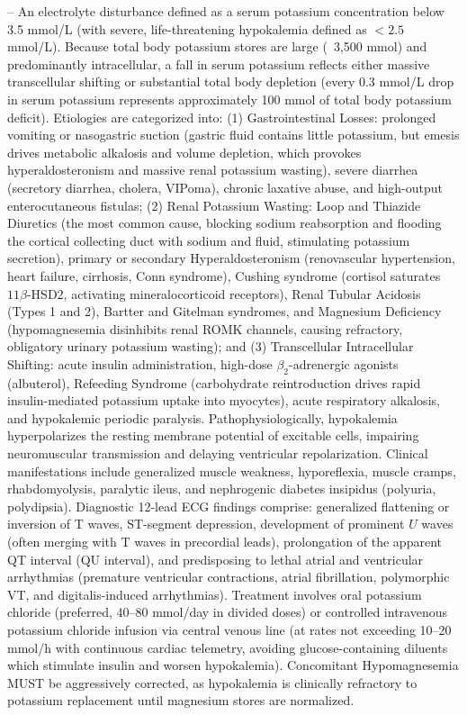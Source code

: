 -- An electrolyte disturbance defined as a serum potassium concentration below 3.5 mmol/L (with severe, life-threatening hypokalemia defined as $<2.5$ mmol/L). Because total body potassium stores are large (~3,500 mmol) and predominantly intracellular, a fall in serum potassium reflects either massive transcellular shifting or substantial total body depletion (every 0.3 mmol/L drop in serum potassium represents approximately 100 mmol of total body potassium deficit). Etiologies are categorized into: (1) Gastrointestinal Losses: prolonged vomiting or nasogastric suction (gastric fluid contains little potassium, but emesis drives metabolic alkalosis and volume depletion, which provokes hyperaldosteronism and massive renal potassium wasting), severe diarrhea (secretory diarrhea, cholera, VIPoma), chronic laxative abuse, and high-output enterocutaneous fistulas; (2) Renal Potassium Wasting: Loop and Thiazide Diuretics (the most common cause, blocking sodium reabsorption and flooding the cortical collecting duct with sodium and fluid, stimulating potassium secretion), primary or secondary Hyperaldosteronism (renovascular hypertension, heart failure, cirrhosis, Conn syndrome), Cushing syndrome (cortisol saturates $11\beta$-HSD2, activating mineralocorticoid receptors), Renal Tubular Acidosis (Types 1 and 2), Bartter and Gitelman syndromes, and Magnesium Deficiency (hypomagnesemia disinhibits renal ROMK channels, causing refractory, obligatory urinary potassium wasting); and (3) Transcellular Intracellular Shifting: acute insulin administration, high-dose $\beta_2$-adrenergic agonists (albuterol), Refeeding Syndrome (carbohydrate reintroduction drives rapid insulin-mediated potassium uptake into myocytes), acute respiratory alkalosis, and hypokalemic periodic paralysis. Pathophysiologically, hypokalemia hyperpolarizes the resting membrane potential of excitable cells, impairing neuromuscular transmission and delaying ventricular repolarization. Clinical manifestations include generalized muscle weakness, hyporeflexia, muscle cramps, rhabdomyolysis, paralytic ileus, and nephrogenic diabetes insipidus (polyuria, polydipsia). Diagnostic 12-lead ECG findings comprise: generalized flattening or inversion of T waves, ST-segment depression, development of prominent $U$ waves (often merging with T waves in precordial leads), prolongation of the apparent QT interval (QU interval), and predisposing to lethal atrial and ventricular arrhythmias (premature ventricular contractions, atrial fibrillation, polymorphic VT, and digitalis-induced arrhythmias). Treatment involves oral potassium chloride (preferred, 40--80 mmol/day in divided doses) or controlled intravenous potassium chloride infusion via central venous line (at rates not exceeding 10--20 mmol/h with continuous cardiac telemetry, avoiding glucose-containing diluents which stimulate insulin and worsen hypokalemia). Concomitant Hypomagnesemia MUST be aggressively corrected, as hypokalemia is clinically refractory to potassium replacement until magnesium stores are normalized.

